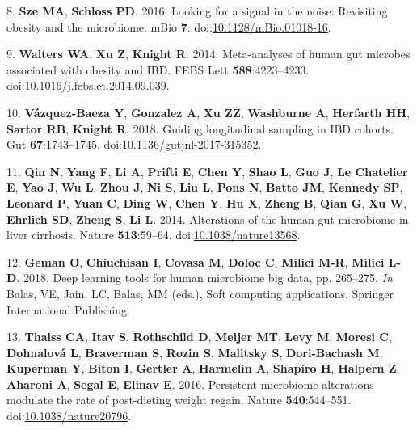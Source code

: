 \documentclass[11pt,]{article}
\begin{document}
\hypertarget{ref-sze_looking_2016}{}
8. \textbf{Sze MA}, \textbf{Schloss PD}. 2016. Looking for a signal in
the noise: Revisiting obesity and the microbiome. mBio \textbf{7}.
doi:\href{https://doi.org/10.1128/mBio.01018-16}{10.1128/mBio.01018-16}.

\hypertarget{ref-walters_meta-analyses_2014}{}
9. \textbf{Walters WA}, \textbf{Xu Z}, \textbf{Knight R}. 2014.
Meta-analyses of human gut microbes associated with obesity and IBD.
FEBS Lett \textbf{588}:4223--4233.
doi:\href{https://doi.org/10.1016/j.febslet.2014.09.039}{10.1016/j.febslet.2014.09.039}.

\hypertarget{ref-vazquez-baeza_guiding_2018}{}
10. \textbf{Vázquez-Baeza Y}, \textbf{Gonzalez A}, \textbf{Xu ZZ},
\textbf{Washburne A}, \textbf{Herfarth HH}, \textbf{Sartor RB},
\textbf{Knight R}. 2018. Guiding longitudinal sampling in IBD cohorts.
Gut \textbf{67}:1743--1745.
doi:\href{https://doi.org/10.1136/gutjnl-2017-315352}{10.1136/gutjnl-2017-315352}.

\hypertarget{ref-qin_alterations_2014}{}
11. \textbf{Qin N}, \textbf{Yang F}, \textbf{Li A}, \textbf{Prifti E},
\textbf{Chen Y}, \textbf{Shao L}, \textbf{Guo J}, \textbf{Le Chatelier
E}, \textbf{Yao J}, \textbf{Wu L}, \textbf{Zhou J}, \textbf{Ni S},
\textbf{Liu L}, \textbf{Pons N}, \textbf{Batto JM}, \textbf{Kennedy SP},
\textbf{Leonard P}, \textbf{Yuan C}, \textbf{Ding W}, \textbf{Chen Y},
\textbf{Hu X}, \textbf{Zheng B}, \textbf{Qian G}, \textbf{Xu W},
\textbf{Ehrlich SD}, \textbf{Zheng S}, \textbf{Li L}. 2014. Alterations
of the human gut microbiome in liver cirrhosis. Nature
\textbf{513}:59--64.
doi:\href{https://doi.org/10.1038/nature13568}{10.1038/nature13568}.

\hypertarget{ref-geman_deep_2018}{}
12. \textbf{Geman O}, \textbf{Chiuchisan I}, \textbf{Covasa M},
\textbf{Doloc C}, \textbf{Milici M-R}, \textbf{Milici L-D}. 2018. Deep
learning tools for human microbiome big data, pp. 265--275. \emph{In}
Balas, VE, Jain, LC, Balas, MM (eds.), Soft computing applications.
Springer International Publishing.

\hypertarget{ref-thaiss_persistent_2016}{}
13. \textbf{Thaiss CA}, \textbf{Itav S}, \textbf{Rothschild D},
\textbf{Meijer MT}, \textbf{Levy M}, \textbf{Moresi C},
\textbf{Dohnalová L}, \textbf{Braverman S}, \textbf{Rozin S},
\textbf{Malitsky S}, \textbf{Dori-Bachash M}, \textbf{Kuperman Y},
\textbf{Biton I}, \textbf{Gertler A}, \textbf{Harmelin A},
\textbf{Shapiro H}, \textbf{Halpern Z}, \textbf{Aharoni A},
\textbf{Segal E}, \textbf{Elinav E}. 2016. Persistent microbiome
alterations modulate the rate of post-dieting weight regain. Nature
\textbf{540}:544--551.
doi:\href{https://doi.org/10.1038/nature20796}{10.1038/nature20796}.
\end{document}
